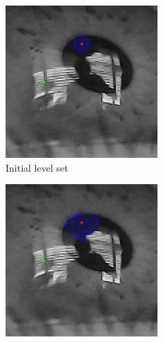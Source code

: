 \begin{figure}[h]
    \centering
    \begin{subfigure}{0.3\textwidth}
        \centering
        \includegraphics[width=0.9\linewidth]{plots/acwe/iteration_0.png}
        \caption{Initial level set}
    \end{subfigure}%
    \hfill
    \begin{subfigure}{0.3\textwidth}
        \centering
        \includegraphics[width=0.9\linewidth]{plots/acwe/iteration_15.png}

\end{subfigure}
\end{figure}
